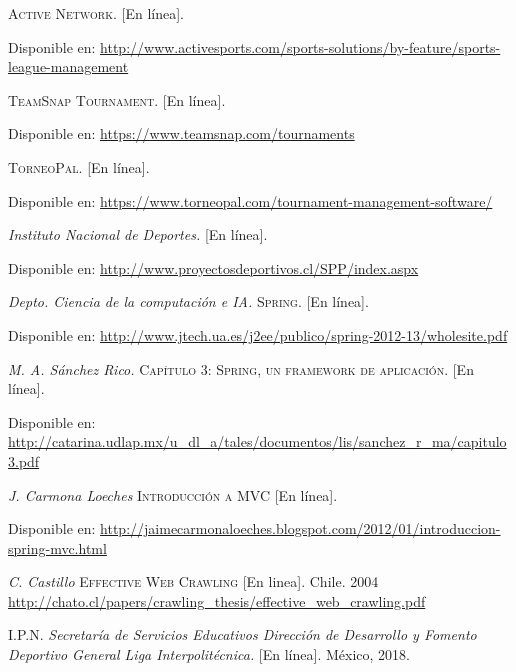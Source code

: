 \begin{thebibliography}{}
	\textit{}
	\textsc{Active Network.} [En línea].
	
	Disponible en: 
	\url{http://www.activesports.com/sports-solutions/by-feature/sports-league-management}
	
	\textit{}
	\textsc{TeamSnap Tournament.} [En línea].
	
	Disponible en:
	\url{https://www.teamsnap.com/tournaments}
	
	\textit{}
	\textsc{TorneoPal.} [En línea].
	
	Disponible en: 
	\url{ https://www.torneopal.com/tournament-management-software/}
	
	\textit{Instituto Nacional de Deportes.}
	\textsc{}[En línea].
	
	Disponible en:
	\url{http://www.proyectosdeportivos.cl/SPP/index.aspx}
	
	\textit{Depto. Ciencia de la computación e IA.}
	\textsc{Spring.} [En línea]. 
	
	Disponible en:
	\url{http://www.jtech.ua.es/j2ee/publico/spring-2012-13/wholesite.pdf}
	
	\textit{M. A. Sánchez Rico.}
	\textsc{Capítulo 3: Spring, un framework de aplicación.} [En línea].
	
	Disponible en:
	\url{http://catarina.udlap.mx/u_dl_a/tales/documentos/lis/sanchez_r_ma/capitulo3.pdf}

	\textit{J. Carmona Loeches}
	\textsc{Introducción a MVC} [En línea]. 
	
	Disponible en: 
	\url{http://jaimecarmonaloeches.blogspot.com/2012/01/introduccion-spring-mvc.html}
	
	\textit{C. Castillo}
	\textsc{Effective Web Crawling}
	[En linea]. Chile. 2004
	\url{http://chato.cl/papers/crawling_thesis/effective_web_crawling.pdf}
	
	\textsc{I.P.N.}
	\textit{Secretaría de Servicios Educativos Dirección de Desarrollo y Fomento Deportivo General Liga Interpolitécnica.}
	[En línea]. México, 2018.
	

\end{thebibliography}
